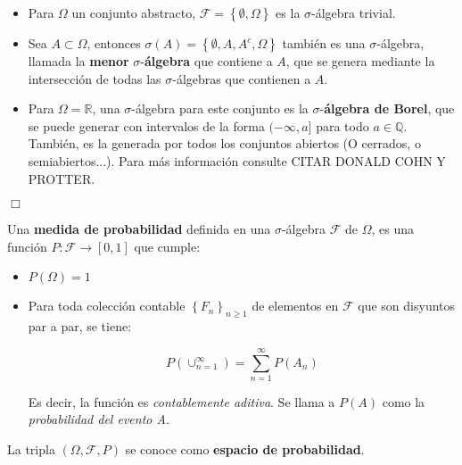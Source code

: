 \begin{itemize}

	\item Para $\Omega$ un conjunto abstracto, $\mathcal{F} = \left\{ \emptyset, \Omega \right\}$ es la $\sigma$-álgebra trivial. 

	\item Sea $A \subset \Omega$, entonces $\sigma(A) = \left\{ \emptyset, A, A^c, \Omega \right\}$ también es una $\sigma$-álgebra, llamada la \textbf{menor} $\mathbb{\sigma}$-\textbf{álgebra} que contiene a $A$, que se genera mediante la intersección de todas las $\sigma$-álgebras que contienen a $A$. 

	\item Para $\Omega = \mathbb{R}$, una $\sigma$-álgebra para este conjunto es la $\sigma$-\textbf{álgebra de Borel}, que se puede generar con intervalos de la forma $(-\infty, a]$ para todo $a \in \mathbb{Q}$. También, es la generada por todos los conjuntos abiertos (O cerrados, o semiabiertos...). Para más información consulte CITAR DONALD COHN Y PROTTER.  

\end{itemize}

\begin{flushright}
	$\Box$
\end{flushright}


\begin{boxDef}
	Una \textbf{medida de probabilidad} definida en una $\sigma$-álgebra $\mathcal{F}$ de $\Omega$, es una función $P: \mathcal{F} \rightarrow [0,1]$ que cumple:

	\begin{itemize}
		\item $P(\Omega) =  1$\\
		\item Para toda colección contable $\left\{ F_n \right\}_{n \geq 1}$ de elementos en $\mathcal{F}$ que son disyuntos par a par, se tiene:

		\[
			P\left( \cup_{n=1}^{\infty}  \right) = \sum_{n = 1}^{\infty} P\left( A_n \right)
		\]

		Es decir, la función es \textit{contablemente aditiva}. Se llama a $P(A)$ como la \textit{probabilidad del evento A}.

	\end{itemize}

La tripla $(\Omega, \mathcal{F}, P)$ se conoce como \textbf{espacio de probabilidad}.

\end{boxDef}

